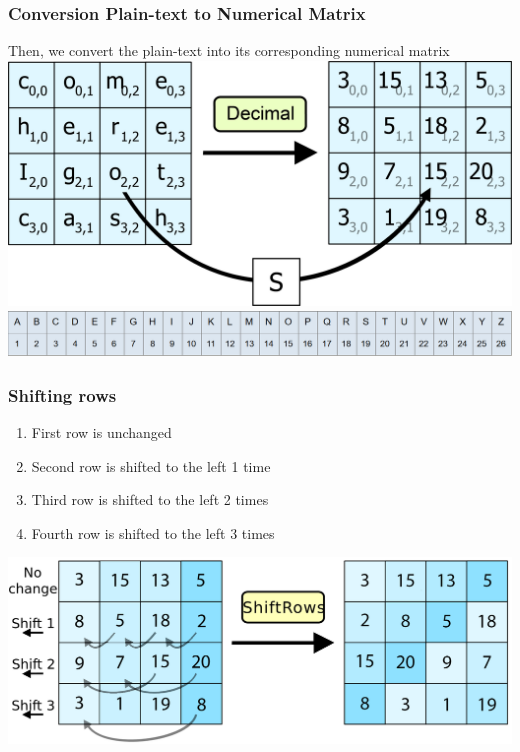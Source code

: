\documentclass[11pt]{beamer}
\begin{document}
\begin{frame}\frametitle{Conversion Plain-text to Numerical Matrix}
\footnotesize Then, we convert the plain-text into its corresponding numerical matrix 
\center \includegraphics[scale=0.275]{conversion_AES_1}
\center \includegraphics[scale=0.275]{numerical}
\end{frame}

\begin{frame}\frametitle{Shifting rows}
	\begin{enumerate}[1]
		\item First row is unchanged
		\item Second row is shifted to the left 1 time
		\item Third row is shifted to the left 2 times
		\item Fourth row is shifted to the left 3 times
	\end{enumerate}	
	\center \includegraphics[scale=0.15]{shift_rows_1}
\end{frame}
\end{document}
